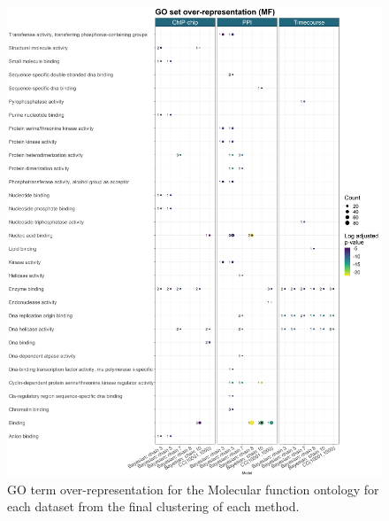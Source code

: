\documentclass[]{article}
\begin{document}
%

\begin{figure}
	\centering
	\includegraphics[scale=0.365]{./Images/Yeast/goEnrichmentCompMFvertical.png}
	\caption{GO term over-representation for the Molecular function ontology for each dataset from the final clustering of each method.}
	\label{fig:yeastGOMF}
\end{figure}
\end{document}

